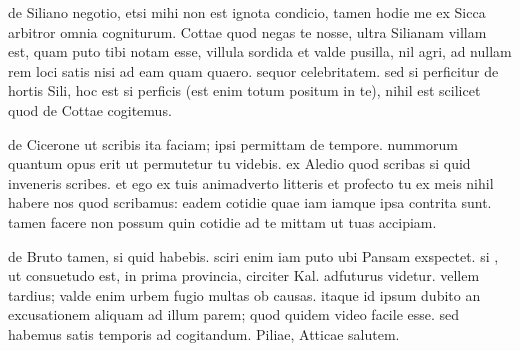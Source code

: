 


 de Siliano negotio, etsi mihi non est ignota condicio, tamen hodie me ex Sicca arbitror omnia cogniturum. Cottae quod negas te nosse, ultra Silianam villam est, quam puto tibi notam esse, villula sordida et valde pusilla, nil agri, ad nullam rem loci satis nisi ad eam quam quaero. sequor celebritatem. sed si perficitur de hortis Sili, hoc est si perficis (est enim totum positum in te), nihil est scilicet quod de Cottae cogitemus.

 de Cicerone ut scribis ita faciam; ipsi permittam de tempore. nummorum quantum opus erit ut permutetur tu videbis. ex Aledio quod scribas si quid inveneris scribes. et ego ex tuis animadverto litteris et profecto tu ex meis nihil habere nos quod scribamus: eadem cotidie quae iam iamque ipsa contrita sunt. tamen facere non possum quin cotidie ad te mittam ut tuas accipiam.

 de Bruto tamen, si quid habebis. sciri enim iam puto ubi Pansam exspectet. si , ut consuetudo est, in prima provincia, circiter Kal. adfuturus videtur. vellem tardius; valde enim urbem fugio multas ob causas. itaque id ipsum dubito an excusationem aliquam ad illum parem; quod quidem video facile esse. sed habemus satis temporis ad cogitandum. Piliae, Atticae salutem.
